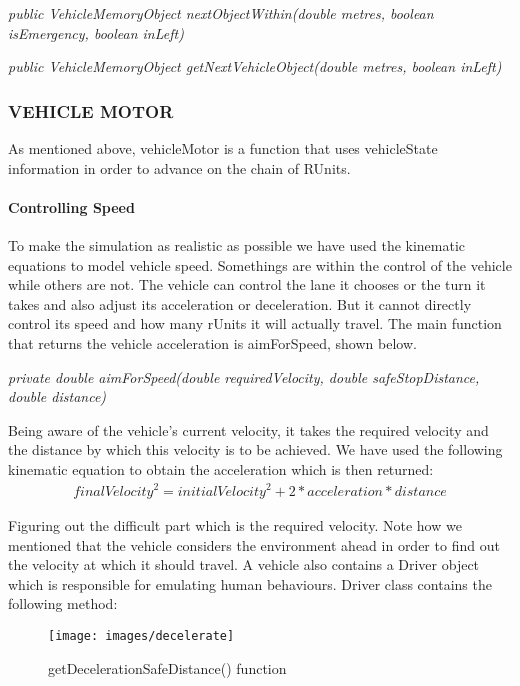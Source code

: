 \documentclass[11pt,a4paper]{article}
\begin{document}
		 \setlength{\parindent}{0cm}\bigskip
		 \textit{public VehicleMemoryObject nextObjectWithin(double metres, boolean isEmergency, boolean inLeft)}
		 
		 \textit{public VehicleMemoryObject getNextVehicleObject(double metres, boolean inLeft)}
  
  \subsubsection{VEHICLE MOTOR}
  
	As mentioned above, vehicleMotor is a function that uses vehicleState information in order to advance on the chain of RUnits. 
  
 
  	\paragraph{Controlling Speed}
  		To make the simulation as realistic as possible we have used the kinematic equations to model vehicle speed. Somethings are within the control of the vehicle while others are not. The vehicle can control the lane it chooses or the turn it takes and also adjust its acceleration or deceleration. But it cannot directly control its speed and how many rUnits it will actually travel. The main function that returns the vehicle acceleration is aimForSpeed, shown below.
  			
  			\setlength{\parindent}{0cm}\bigskip
  			\textit{private double aimForSpeed(double requiredVelocity, double safeStopDistance, double distance)}
  			
   			Being aware of the vehicle’s current velocity, it takes the required velocity and the distance by which this velocity is to be achieved. We have used the following kinematic equation to obtain the acceleration which is then returned:
   				\begin{align}
   				{finalVelocity}^2={initialVelocity}^2 +2*acceleration*distance \nonumber
   			 	\end{align}
  
 	
  	Figuring out the difficult part which is the required velocity. Note how we mentioned that the vehicle considers the environment ahead in order to find out the velocity at which it should travel. A vehicle also contains a Driver object which is responsible for emulating human behaviours. Driver class contains the following method:
  	\begin{figure}[h!]
			\texttt{[image: images/decelerate]}
			\caption{getDecelerationSafeDistance() function}
			\centering
		\end{figure} 
		
\end{document}
